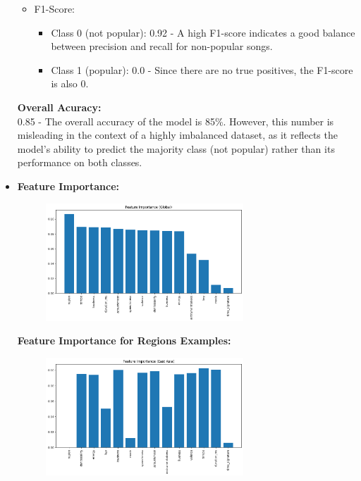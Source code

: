 \begin{itemize}
\begin{itemize}
\begin{itemize}
                \end{itemize}
            \item F1-Score:
                \begin{itemize}
                    \item Class 0 (not popular): 0.92 - A high F1-score indicates a good balance between precision and recall for non-popular songs.
                    \item Class 1 (popular): 0.0 - Since there are no true positives, the F1-score is also 0.
                \end{itemize}
        \end{itemize}
        \textbf{Overall Acuracy: } 
        \\
        0.85 - The overall accuracy of the model is 85\%. However, this number is misleading in the context of a highly imbalanced dataset, as it reflects the model's ability to predict the majority class (not popular) rather than its performance on both classes.
    \item \textbf{Feature Importance: } 
        \begin{figure}[h] 
            \centering 
            \includegraphics[width=0.7\textwidth]{media/random_forest_feature_importance.png} 
        \end{figure}
        \textbf{Feature Importance for Regions Examples: }
        \begin{figure}[h] 
            \centering 
            \includegraphics[width=0.7\textwidth]{media/random_forest_feature_imp_east_asia.png} 

\end{figure}
\end{itemize}
